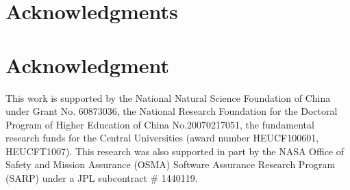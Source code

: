 \documentclass[10pt,journal,letterpaper,compsoc]{IEEEtran}
\begin{document}
\ifCLASSOPTIONcompsoc
  \section*{Acknowledgments}
\else
  \section*{Acknowledgment}
\fi
This work is supported by the National Natural Science Foundation of
China under Grant No. 60873036,
the National Research Foundation for the Doctoral Program of
Higher Education of China No.20070217051,
the fundamental research funds for the Central Universities
(award number HEUCF100601, HEUCFT1007).
This research was also supported in part by the NASA Office of Safety
and Mission Assurance (OSMA) Software Assurance Research Program
(SARP) under a JPL subcontract \# 1440119.

\ifCLASSOPTIONcaptionsoff
  \newpage
\fi



\end{document}
